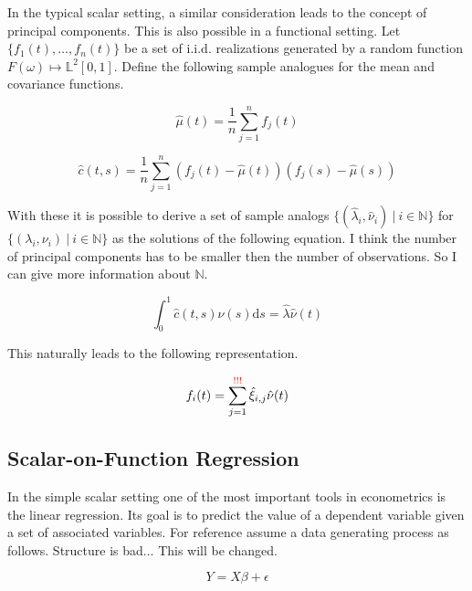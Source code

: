 \documentclass[11pt,twoside,a4paper]{article}
\begin{document}
	In the typical scalar setting, a similar consideration leads to the concept of principal components. This is also possible in a functional setting. Let $\{f_1(t), \dots, f_n(t)\}$ be a set of i.i.d. realizations generated by a random function $F(\omega) \mapsto \mathbb{L}^2[0,1]$.
	Define the following sample analogues for the mean and covariance functions.
	
	\begin{equation}
		\hat{\mu}(t) = \frac{1}{n}\sum_{j = 1}^{n}f_j(t)
	\end{equation}

	\begin{equation}
		\hat{c}(t,s) = \frac{1}{n} \sum_{j = 1}^{n} \left(f_j(t) - \hat{\mu}(t)\right) \left(f_j(s) - \hat{\mu}(s)\right)
	\end{equation}

	With these it is possible to derive a set of sample analogs $\{(\hat{\lambda}_i, \hat{\nu}_i) \: \vert \: i \in \mathbb{N}\}$ for $\{(\lambda_i, \nu_i) \: \vert \: i \in \mathbb{N}\}$ as the solutions of the following equation. {\color{red} I think the number of principal components has to be smaller then the number of observations. So I can give more information about $\mathbb{N}$.}
	
	\begin{equation}
		\int_{0}^{1}\hat{c}(t,s)\hat{\nu}(s) \mathrm{d}s = \hat{\lambda} \hat{\nu}(t)
	\end{equation}
	
	This naturally leads to the following representation.
	
	\begin{equation}
		f_i(t) = \sum_{j = 1}^{{\color{red} !!!}} \hat{\xi}_{i,j} \hat{\nu}(t)
	\end{equation}
	
	\subsection{Scalar-on-Function Regression}
	In the simple scalar setting one of the most important tools in econometrics is the linear regression. Its goal is to predict the value of a dependent variable given a set of associated variables. For reference assume a data generating process as follows. {\color{red} Structure is bad... This will be changed.}
	
	\begin{equation}
		Y = X\beta + \epsilon
	\end{equation}
	
\end{document}

